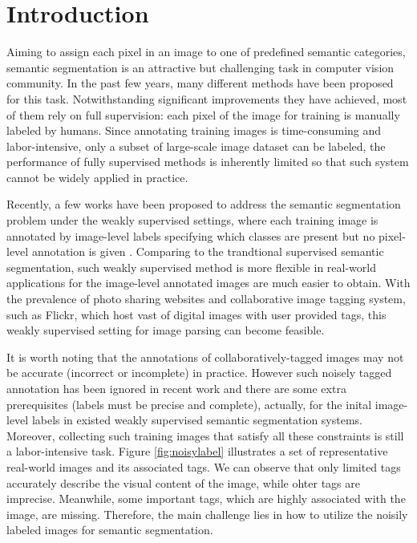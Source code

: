 \section{Introduction}
Aiming to assign each pixel in an image to one of predefined semantic categories, semantic segmentation is an attractive but challenging task in computer vision community. In the past few years, many different methods \cite{csurka2011efficient,gonfaus2010harmony,ladicky2009associative,nowozin2010parameter,shotton2008semantic,shotton2006textonboost,singh2013nonparametric,verbeek2007scene,yang2007multiple,yao2012describing} have been proposed for this task. Notwithstanding significant improvements they have achieved, most of them rely on full supervision: each pixel of the image for training is manually labeled by humans. Since annotating training images is time-consuming and labor-intensive, only a subset of large-scale image dataset can be labeled, the performance of fully supervised methods is inherently limited so that such system cannot be widely applied in practice.

Recently, a few works have been proposed to address the semantic segmentation problem under the weakly supervised settings, where each training image is annotated by image-level labels specifying which classes are present but no pixel-level annotation is given \cite{verbeek2007region,vezhnevets2010towards,vezhnevets2011weakly,vezhnevets2012weakly,xu2014tell,zhang2013sparse}. Comparing to the trandtional supervised semantic segmentation, such weakly supervised method is more flexible in real-world applications for the image-level annotated images are much easier to obtain. With the prevalence of photo sharing websites and collaborative image tagging system, such as Flickr, which host vast of digital images with user provided tags, this weakly supervised setting for image parsing can become feasible.

It is worth noting that the annotations of collaboratively-tagged images may not be accurate (incorrect or incomplete) in practice. However such noisely tagged annotation has been ignored in recent work and  there are some extra prerequisites (\eg labels must be precise and complete), actually, for the inital image-level labels in existed weakly supervised semantic segmentation systems. Moreover, collecting such training images that satisfy all these constraints is still a labor-intensive task. Figure \ref{fig:noisylabel} illustrates a set of representative real-world images and its associated tags. We can observe that only limited tags accurately describe the visual content of the image, while ohter tags are imprecise. Meanwhile, some important tags, which are highly associated with the image, are missing. Therefore, the main challenge lies in how to utilize the noisily labeled images for semantic segmentation. 


